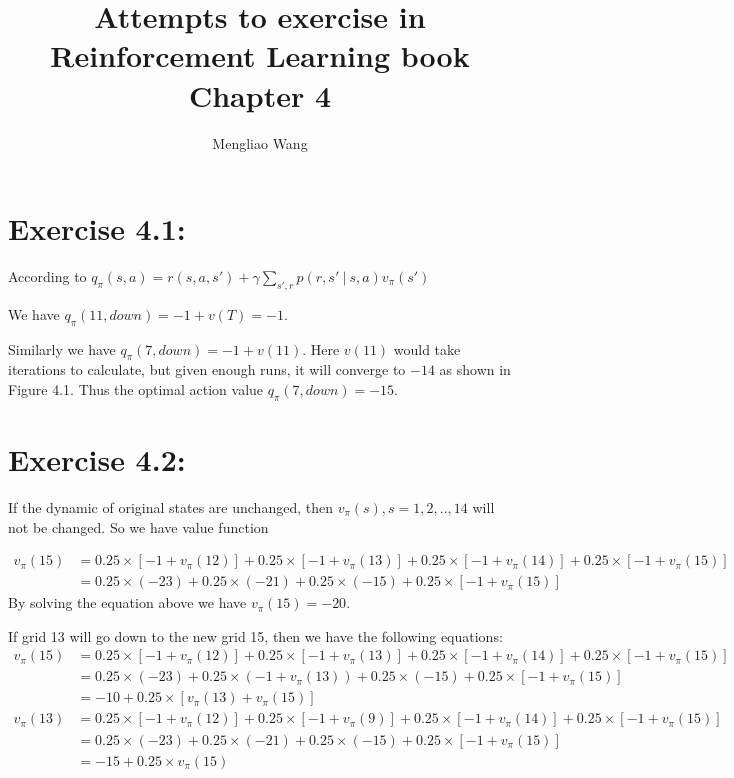 \documentclass[10pt,letterpaper]{article}
\title{Attempts to exercise in Reinforcement Learning book Chapter 4}
\author{Mengliao Wang}
\newcommand\given[1][]{\:#1\vert\:}
\begin{document}
\maketitle



\section*{Exercise 4.1: }
\label{4.1}

According to $q_\pi(s,a) = r(s,a,s') + \gamma\sum_{s',r}p(r,s'\given s,a)v_\pi(s')$

We have $q_\pi(11, down) = -1 + v(T) = -1$.

Similarly we have $q_\pi(7, down) = -1 + v(11)$. Here $v(11)$ would take iterations to calculate, but given enough runs, it will converge to $-14$ as shown in Figure 4.1. Thus the optimal action value $q_\pi(7, down) = -15$.

\section*{Exercise 4.2: }
\label{4.2}

If the dynamic of original states are unchanged, then $v_\pi(s), s=1,2,..,14$ will not be changed. So we have value function 

\begin{align}
v_\pi(15) &= 0.25\times[-1 + v_\pi(12)] + 0.25\times[-1 + v_\pi(13)]  + 0.25\times[-1 + v_\pi(14)] + 0.25\times[-1 + v_\pi(15)]\\
&= 0.25\times(-23) + 0.25\times(-21)  + 0.25\times(-15) + 0.25\times[-1 + v_\pi(15)]
\end{align}
By solving the equation above we have $v_\pi(15) = -20$.

If grid 13 will go down to the new grid 15, then we have the following equations:
\begin{align}
v_\pi(15) &= 0.25\times[-1 + v_\pi(12)] + 0.25\times[-1 + v_\pi(13)]  + 0.25\times[-1 + v_\pi(14)] + 0.25\times[-1 + v_\pi(15)]\\
&= 0.25\times(-23) + 0.25\times(-1 + v_\pi(13))  + 0.25\times(-15) + 0.25\times[-1 + v_\pi(15)]\\
&= -10 + 0.25\times[v_\pi(13) + v_\pi(15)]\\
v_\pi(13) &= 0.25\times[-1 + v_\pi(12)] + 0.25\times[-1 + v_\pi(9)]  + 0.25\times[-1 + v_\pi(14)] + 0.25\times[-1 + v_\pi(15)]\\
&= 0.25\times(-23) + 0.25\times(-21)  + 0.25\times(-15) + 0.25\times[-1 + v_\pi(15)]\\
&= -15 + 0.25\times v_\pi(15)
\end{align}
\end{document}
